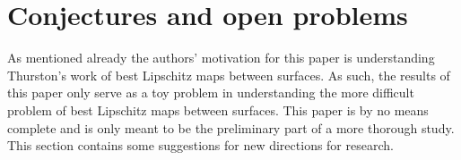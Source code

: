 \documentclass{ip-journal}
\newtheorem{theorem}{Theorem}[section]
\theoremstyle{definition}
\newtheorem{remark}[theorem]{Remark}
\numberwithin{equation}{section}
\begin{document}
%

\section{Conjectures and open problems}\label{conjectures}
As mentioned already the authors' motivation for this paper is understanding Thurston's work of best Lipschitz maps between surfaces. As such, the results of this paper only serve as a toy problem in understanding the more difficult problem of best Lipschitz maps between surfaces.
This paper is by no means complete and is only meant to be the preliminary part of a more thorough study.   
This section contains some  suggestions for new directions for research. 
\end{document}
